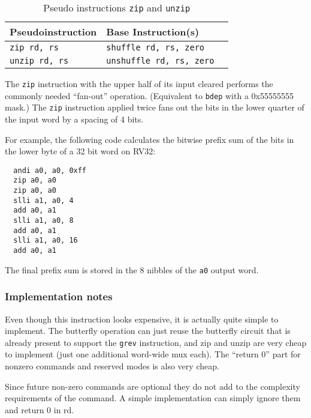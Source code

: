 \begin{table}[h]
\begin{small}
\begin{center}
\begin{tabular}{l l l}
Pseudoinstruction & Base Instruction(s) \\ \hline
{\tt zip rd, rs} & {\tt shuffle rd, rs, zero} \\
{\tt unzip rd, rs} & {\tt unshuffle rd, rs, zero} \\
\hline

\end{tabular}
\end{center}
\end{small}
\caption{Pseudo instructions {\tt zip} and {\tt unzip}}
\label{pseudos-zip-unzip}
\end{table}

The \texttt{zip} instruction with the upper half of its input cleared performs
the commonly needed ``fan-out'' operation. (Equivalent to {\tt bdep} with a
0x55555555 mask.) The \texttt{zip} instruction applied twice fans out the bits
in the lower quarter of the input word by a spacing of 4 bits.

For example, the following code calculates the bitwise prefix sum of the bits
in the lower byte of a 32 bit word on RV32:

\begin{verbatim}
  andi a0, a0, 0xff
  zip a0, a0
  zip a0, a0
  slli a1, a0, 4
  add a0, a1
  slli a1, a0, 8
  add a0, a1
  slli a1, a0, 16
  add a0, a1
\end{verbatim}

The final prefix sum is stored in the 8 nibbles of the {\tt a0} output word.

\subsubsection{Implementation notes}

Even though this instruction looks expensive, it is actually quite simple to
implement.  The butterfly operation can just reuse the butterfly circuit that
is already present to support the {\tt grev} instruction, and zip and unzip are
very cheap to implement (just one additional word-wide mux each). The ``return
0'' part for nonzero commands and reserved modes is also very cheap.

Since future non-zero commands are optional they do not add to the complexity
requirements of the command. A simple implementation can simply ignore them
and return 0 in rd.

